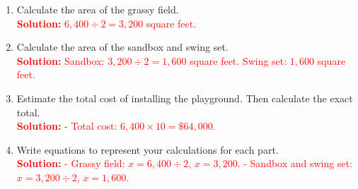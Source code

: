 \documentclass[12pt]{article}
\begin{document}
\vspace{1em}

\begin{tcolorbox}[colframe=black!60, colback=white, 
coltitle=black, colbacktitle=black!15, fonttitle=\bfseries\Large, 
title=Performance Task: Designing a Playground - Answer Key, halign title=center, left=10pt, right=10pt, top=10pt, bottom=50pt]
\begin{enumerate}[itemsep=3em]
    \item Calculate the area of the grassy field.\\
    \textcolor{red}{\textbf{Solution:} \( 6,400 \div 2 = 3,200 \) square feet.}

    \item Calculate the area of the sandbox and swing set.\\
    \textcolor{red}{\textbf{Solution:} 
    Sandbox: \( 3,200 \div 2 = 1,600 \) square feet. 
    Swing set: \( 1,600 \) square feet.}

    \item Estimate the total cost of installing the playground. Then calculate the exact total.\\
    \textcolor{red}{\textbf{Solution:} 
    - Total cost: \( 6,400 \times 10 = \$64,000 \).}

    \item Write equations to represent your calculations for each part.\\
    \textcolor{red}{\textbf{Solution:} 
    - Grassy field: \( x = 6,400 \div 2 \), \( x = 3,200 \). 
    - Sandbox and swing set: \( x = 3,200 \div 2 \), \( x = 1,600 \).}
\end{enumerate}
\end{tcolorbox}
\end{document}
